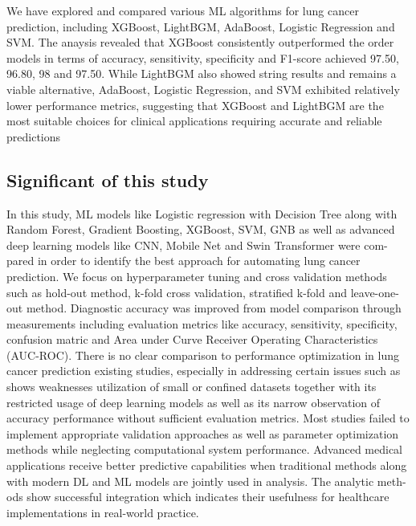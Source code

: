 \documentclass[runningheads]{llncs}
\begin{document}
We have explored and compared various ML algorithms for lung cancer prediction, including XGBoost, LightBGM, AdaBoost, Logistic Regression and SVM. The anaysis revealed that XGBoost consistently outperformed the order models in terms of accuracy, sensitivity, specificity and F1-score achieved 97.50, 96.80, 98 and 97.50. While LightBGM also showed string results and remains a viable alternative, AdaBoost, Logistic Regression, and SVM exhibited relatively lower performance metrics, suggesting that XGBoost and LightBGM are the most suitable choices for clinical applications requiring accurate and reliable predictions \cite{abdullah2021} 


\subsection{Significant of this study }
In this study, ML models like Logistic regression with Decision Tree along with Random Forest, Gradient Boosting, XGBoost, SVM, GNB as well as advanced deep learning models like CNN, Mobile Net and Swin Transformer were com-pared in order to identify the best approach for automating lung cancer prediction. We focus on hyperparameter tuning and cross validation methods such as hold-out method, k-fold cross validation, stratified k-fold and leave-one-out method. Diagnostic accuracy was improved from model comparison through measurements including evaluation metrics like accuracy, sensitivity, specificity, confusion matric and Area under Curve Receiver Operating Characteristics (AUC-ROC). There is no clear comparison to performance optimization in lung cancer prediction existing studies, especially in addressing certain issues such as shows weaknesses utilization of small or confined datasets together with its restricted usage of deep learning models as well as its narrow observation of accuracy performance without sufficient evaluation metrics. Most studies failed to implement appropriate validation approaches as well as parameter optimization methods while neglecting computational system performance. Advanced medical applications receive better predictive capabilities when traditional methods along with modern DL and ML models are jointly used in analysis. The analytic meth-ods show successful integration which indicates their usefulness for healthcare implementations in real-world practice.
\end{document}
